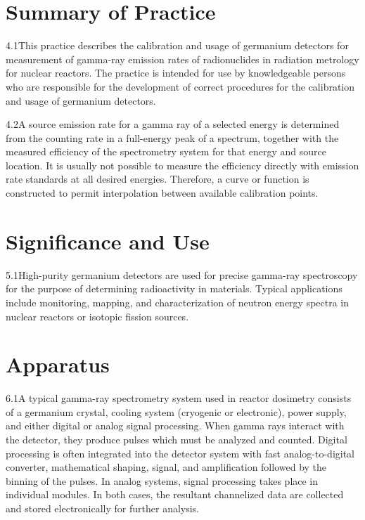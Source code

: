 \documentclass[12pt]{article}
\begin{document}
\section{Summary of Practice}

4.1\quad This practice describes the calibration and usage of germanium detectors for
measurement of gamma-ray emission rates of radionuclides in radiation metrology for
nuclear reactors. The practice is intended for use by knowledgeable persons who are
responsible for the development of correct procedures for the calibration and usage of
germanium detectors.

4.2\quad A source emission rate for a gamma ray of a selected energy is determined from
the counting rate in a full-energy peak of a spectrum, together with the measured
efficiency of the spectrometry system for that energy and source location. It is usually
not possible to measure the efficiency directly with emission rate standards at all desired
energies. Therefore, a curve or function is constructed to permit interpolation between
available calibration points.

\section{Significance and Use}

5.1\quad High-purity germanium detectors are used for precise gamma-ray spectroscopy for
the purpose of determining radioactivity in materials. Typical applications include
monitoring, mapping, and characterization of neutron energy spectra in nuclear reactors or
isotopic fission sources.

\section{Apparatus}

6.1\quad A typical gamma-ray spectrometry system used in reactor dosimetry consists of a
germanium crystal, cooling system (cryogenic or electronic), power supply, and either
digital or analog signal processing. When gamma rays interact with the detector, they
produce pulses which must be analyzed and counted. Digital processing is often integrated
into the detector system with fast analog-to-digital converter, mathematical shaping,
signal, and amplification followed by the binning of the pulses. In analog systems, signal
processing takes place in individual modules. In both cases, the resultant channelized
data are collected and stored electronically for further analysis.
\end{document}
